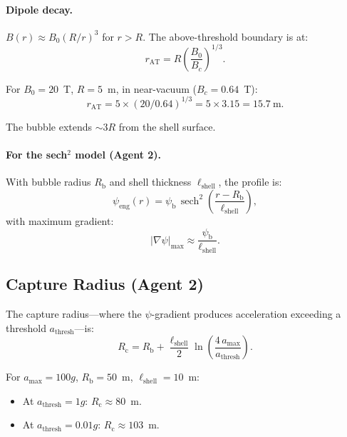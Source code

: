 \documentclass[12pt,aps,prd,superscriptaddress,nofootinbib,longbibliography]{revtex4-2}
\newcommand{\psib}{\psi_{\mathrm{b}}}
\newcommand{\Rb}{R_{\mathrm{b}}}
\newcommand{\Rc}{R_{\mathrm{c}}}
\newcommand{\Lshell}{\ell_{\mathrm{shell}}}
\begin{document}
\paragraph{Dipole decay.}
$B(r) \approx B_0 (R/r)^3$ for $r > R$.  The above-threshold boundary
is at:
\begin{equation}
r_{\mathrm{AT}} = R \left(\frac{B_0}{B_c}\right)^{1/3}.
\end{equation}

For $B_0 = 20$~T, $R = 5$~m, in near-vacuum ($B_c = 0.64$~T):
\begin{equation}
r_{\mathrm{AT}} = 5 \times (20/0.64)^{1/3} = 5 \times 3.15 = 15.7~\mathrm{m}.
\end{equation}

The bubble extends $\sim 3R$ from the shell surface.

\paragraph{For the sech$^2$ model (Agent 2).}
With bubble radius $\Rb$ and shell thickness $\Lshell$, the profile is:
\begin{equation}
\psi_{\mathrm{eng}}(r) = \psib \, \operatorname{sech}^2\!\left(
\frac{r - \Rb}{\Lshell}\right),
\end{equation}
with maximum gradient:
\begin{equation}
|\nabla\psi|_{\mathrm{max}} \approx \frac{\psib}{\Lshell}.
\end{equation}

\subsection{Capture Radius (Agent 2)}

The capture radius---where the $\psi$-gradient produces acceleration
exceeding a threshold $a_{\mathrm{thresh}}$---is:
\begin{equation}
\Rc = \Rb + \frac{\Lshell}{2}\ln\!\left(
\frac{4\,a_{\mathrm{max}}}{a_{\mathrm{thresh}}}\right).
\end{equation}

For $a_{\mathrm{max}} = 100g$, $\Rb = 50$~m, $\Lshell = 10$~m:
\begin{itemize}
\item At $a_{\mathrm{thresh}} = 1g$: $\Rc \approx 80$~m.
\item At $a_{\mathrm{thresh}} = 0.01g$: $\Rc \approx 103$~m.
\end{itemize}
\end{document}

